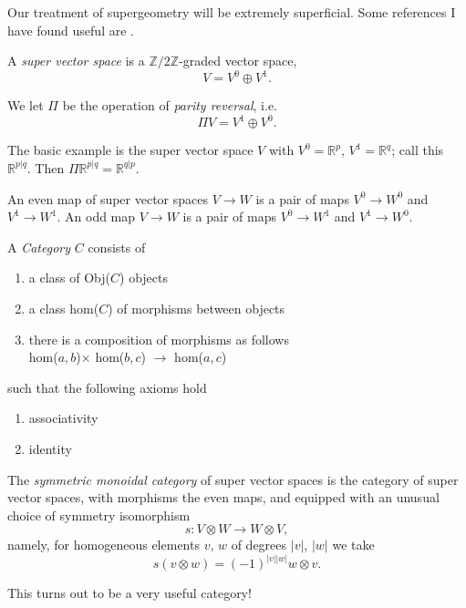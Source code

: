 \documentclass[12pt,letterpaper,reqno]{article}
\numberwithin{equation}{section}
\newcommand{\R}{\ensuremath{\mathbb R}}
\newcommand{\Z}{\ensuremath{\mathbb Z}}
\newcommand{\abs}[1]{\lvert#1\rvert}
\newcommand{\ti}[1]{\textit{#1}}
\begin{document}
Our treatment of supergeometry will be extremely superficial. Some references
I have found useful are \cite{Deligne1999b,etingof,Witten2012,Zakharevich2017}.

\begin{defn} A \ti{super vector space} is a $\Z/2\Z$-graded vector space,
\begin{equation}
  V = V^0 \oplus V^1.
\end{equation}
\end{defn}

We let $\Pi$ be the operation of \ti{parity reversal}, i.e.
\begin{equation}
  \Pi V = V^1 \oplus V^0.
\end{equation}

\begin{example}The basic example is the super vector space $V$
with $V^0 = \R^p$, $V^1 = \R^q$; call this $\R^{p \vert q}$.
Then $\Pi \R^{p \vert q} = \R^{q \vert p}$.
\end{example}

\begin{defn} An even map of super vector spaces
$V \to W$ is a pair of maps $V^0 \to W^0$ and $V^1 \to W^1$.
An odd map $V \to W$ is a pair of maps $V^0 \to W^1$ and $V^1 \to W^0$.
\end{defn}

\begin{defn}[Category]
A \emph{Category} $C$ consists of 
\begin{enumerate}
\item a class of Obj($C$) objects
\item a class hom($C$) of morphisms between objects
\item there is a composition of morphisms as follows\\
hom($a,b$)$\times$ hom($b,c$) $\to$ hom($a,c$) 
\end{enumerate}
such that the following axioms hold
 \begin{enumerate}
 \item associativity
 \item identity
 \end{enumerate}
\end{defn}

\begin{defn}
The \ti{symmetric monoidal category} of super vector spaces 
is the category of super vector spaces, with morphisms the even maps,
and equipped with an unusual choice of symmetry isomorphism
\begin{equation}
  s: V \otimes W \to W \otimes V,
\end{equation}
namely, for homogeneous elements $v$, $w$ of degrees $\abs{v}$, $\abs{w}$
we take
\begin{equation}
  s (v \otimes w) = (-1)^{\abs{v} \abs{w}} w \otimes v.
\end{equation}
\end{defn}
This turns out to be a very useful category!
\end{document}
